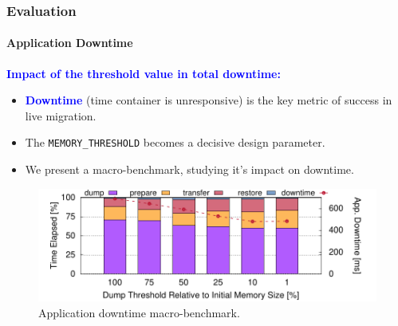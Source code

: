 \documentclass[9pt,    %
    english,            %
    xcolor=table,       %
    envcountsect,        %
    aspectratio=169     %
]{beamer}
\begin{document}
\begin{frame}
    \frametitle{Evaluation}
    \framesubtitle{Application Downtime}

    \vspace{10pt}

    \textbf{\textcolor{blue}{Impact of the threshold value in total downtime:}}
    \begin{itemize}
        \item \textcolor{blue}{\textbf{Downtime}} (time container is unresponsive) is the key metric of success in live migration.
        \item The \texttt{MEMORY\_THRESHOLD} becomes a decisive design parameter.
        \item We present a macro-benchmark, studying it's impact on downtime.
    \end{itemize}

    \vspace{-5pt}

    \begin{figure}
        \centering
        \includegraphics[width=.75\textwidth]{./figs/downtime.pdf}
        \caption{Application downtime macro-benchmark.\label{fig:diskless-microbecnhmark}}
    \end{figure}
    
\end{frame}
\end{document}
